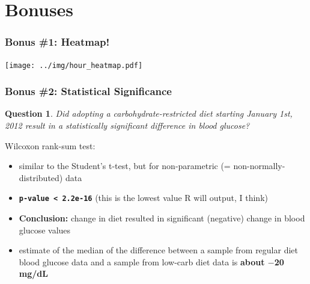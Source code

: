 \documentclass{beamer}
\newtheorem{question}{Question}
\begin{document}
\section{Bonuses}

\begin{frame}
  \frametitle{Bonus \#1: Heatmap!}
  
  \begin{center}
    \texttt{[image: ../img/hour\_heatmap.pdf]}
  \end{center}
\end{frame}

\begin{frame}
  \frametitle{Bonus \#2: Statistical Significance}

  \begin{question}
     Did adopting a carbohydrate-restricted diet starting January 1st, 2012 result in a statistically significant difference in
     blood glucose?
  \end{question}
  Wilcoxon rank-sum test:
  \begin{itemize}
  \item similar to the Student's t-test, but for non-parametric (= non-normally-distributed) data
  \item \textbf{\texttt{p-value < 2.2e-16}} (this is the lowest value R will output, I think)
  \item \textbf{Conclusion:} change in diet resulted in significant (negative) change in blood glucose values
  \item estimate of the median of the difference between a sample from regular diet blood glucose data and a sample from low-carb
    diet data is \textbf{about $-$20 mg/dL}
  \end{itemize}

\end{frame}
\end{document}
